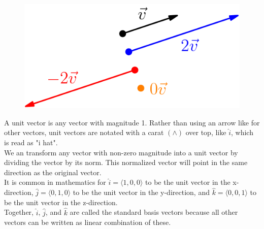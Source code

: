 \begin{figure}[h]
	\centering
	\includegraphics[scale=0.5]{Images/backgroundReview/ScalarMultiples}
\end{figure}

\noindent
A unit vector is any vector with magnitude 1. Rather than using an arrow like for other vectors, unit vectors are notated with a carat $\left(\wedge \right)$ over top, like $\hat{i}$, which is read as "i hat".\\
We an transform any vector with non-zero magnitude into a unit vector by dividing the vector by its norm. This normalized vector will point in the same direction as the original vector.\\

\noindent
It is common in mathematics for $\hat{i} = \langle 1,0,0 \rangle$ to be the unit vector in the x-direction, $\hat{j} = \langle 0,1,0 \rangle$ to be the unit vector in the y-direction, and $\hat{k} = \langle 0,0,1 \rangle$ to be the unit vector in the z-direction.\\
Together, $\hat{i}$, $\hat{j}$, and $\hat{k}$ are called the standard basis vectors because all other vectors can be written as linear combination of these.


